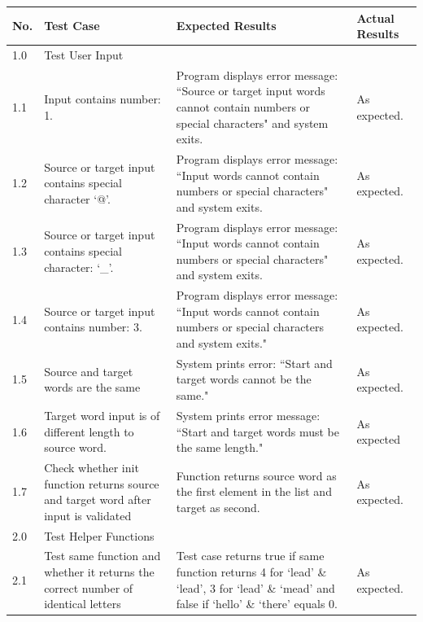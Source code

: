 \documentclass[12pt, a4]{report}
\begin{document}
		\begin{tabular}{ |p{0.5cm}|p{5cm}|p{5cm}|p{5cm}| }
			\hline
			No. & Test Case & Expected Results & Actual Results \\
			\hline
			1.0 & Test User Input &  & \\
			1.1 & Input contains number: 1. & Program displays error message: ``Source or target input words cannot contain numbers or special characters" and system exits. & As expected.\\
			1.2 & Source or target input contains special character `@'. & Program displays error message: ``Input words cannot contain numbers or special characters" and system exits. & As expected. \\
			1.3 & Source or target input contains special character: `\_'. & Program displays error message: ``Input words cannot contain numbers or special characters" and system exits. & As expected. \\
			1.4 & Source or target input contains number: 3. & Program displays error message: ``Input words cannot contain numbers or special characters and system exits." & As expected. \\
			1.5 & Source and target words are the same & System prints error: ``Start and target words cannot be the same." & As expected. \\
			1.6 & Target word input is of different length to source word. & System prints error message: ``Start and target words must be the same length." & As expected \\
			1.7 & Check whether init function returns source and target word after input is validated & Function returns source word as the first element in the list and target as second. & As expected.\\
			2.0 & Test Helper Functions &  &  \\
			2.1 & Test same function and whether it returns the correct number of identical letters & Test case returns true if same function returns 4 for `lead' \& `lead', 3 for `lead' \& `mead' and false if `hello' \& `there' equals 0. & As expected. \\
			\hline
		\end{tabular}

			\pagebreak[4]
			
\end{document}
